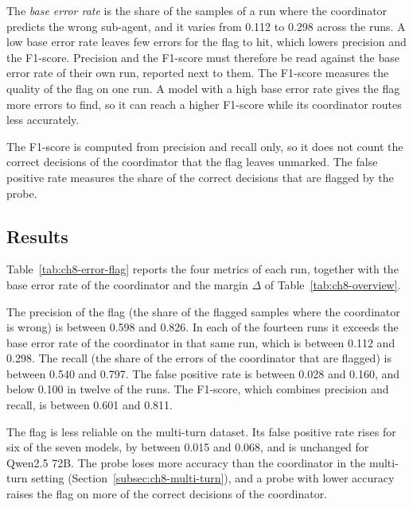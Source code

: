The \emph{base error rate} is the share of the samples of a run where the coordinator predicts the wrong sub-agent, and it varies from 0.112 to 0.298 across the runs. A low base error rate leaves few errors for the flag to hit, which lowers precision and the F1-score. Precision and the F1-score must therefore be read against the base error rate of their own run, reported next to them. The F1-score measures the quality of the flag on one run. A model with a high base error rate gives the flag more errors to find, so it can reach a higher F1-score while its coordinator routes less accurately.

The F1-score is computed from precision and recall only, so it does not count the correct decisions of the coordinator that the flag leaves unmarked. The false positive rate measures the share of the correct decisions that are flagged by the probe.

\subsection{Results}
\label{subsec:ch8-error-flag-results}

Table~\ref{tab:ch8-error-flag} reports the four metrics of each run, together with the base error rate of the coordinator and the margin $\Delta$ of Table~\ref{tab:ch8-overview}.

The precision of the flag (the share of the flagged samples where the coordinator is wrong) is between 0.598 and 0.826. In each of the fourteen runs it exceeds the base error rate of the coordinator in that same run, which is between 0.112 and 0.298. The recall (the share of the errors of the coordinator that are flagged) is between 0.540 and 0.797. The false positive rate is between 0.028 and 0.160, and below 0.100 in twelve of the runs. The F1-score, which combines precision and recall, is between 0.601 and 0.811.

The flag is less reliable on the multi-turn dataset. Its false positive rate rises for six of the seven models, by between 0.015 and 0.068, and is unchanged for Qwen2.5 72B. The probe loses more accuracy than the coordinator in the multi-turn setting (Section~\ref{subsec:ch8-multi-turn}), and a probe with lower accuracy raises the flag on more of the correct decisions of the coordinator.

